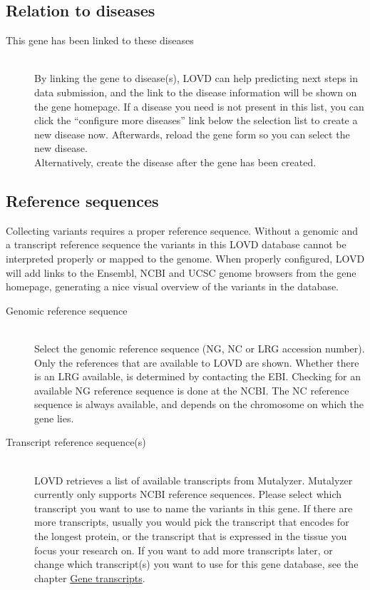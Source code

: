 \documentclass[a4paper,oneside,openany,12pt]{memoir}
\begin{document}
\subsection{Relation to diseases}
\begin{description}
  \item[This gene has been linked to these diseases] \hfill \\
  By linking the gene to disease(s), LOVD can help predicting next steps in data submission,
   and the link to the disease information will be shown on the gene homepage.
  If a disease you need is not present in this list, you can click the
   ``configure more diseases'' link below the selection list to create a new disease now.
  Afterwards, reload the gene form so you can select the new disease.
  \\
  Alternatively, create the disease after the gene has been created.
\end{description}



\subsection{Reference sequences}
Collecting variants requires a proper reference sequence.
Without a genomic and a transcript reference sequence the variants in this LOVD database cannot be interpreted properly or mapped to the genome.
When properly configured, LOVD will add links to the Ensembl, NCBI and UCSC genome browsers from the gene homepage, generating a nice visual overview of the variants in the database.
\begin{description}
  \item[Genomic reference sequence] \hfill \\
  Select the genomic reference sequence (NG, NC or LRG accession number).
  Only the references that are available to LOVD are shown.
  Whether there is an LRG available, is determined by contacting the EBI.
  Checking for an available NG reference sequence is done at the NCBI.
  The NC reference sequence is always available, and depends on the chromosome on which the gene lies.
  \item[Transcript reference sequence(s)] \hfill \\
  LOVD retrieves a list of available transcripts from Mutalyzer.
  Mutalyzer currently only supports NCBI reference sequences.
  Please select which transcript you want to use to name the variants in this gene.
  If there are more transcripts, usually you would pick the transcript that encodes for the longest protein,
   or the transcript that is expressed in the tissue you focus your research on.
  If you want to add more transcripts later, or change which transcript(s) you want to use
   for this gene database, see the chapter \hyperlink{chap:transcripts}{Gene transcripts}.
\end{description}
\end{document}
